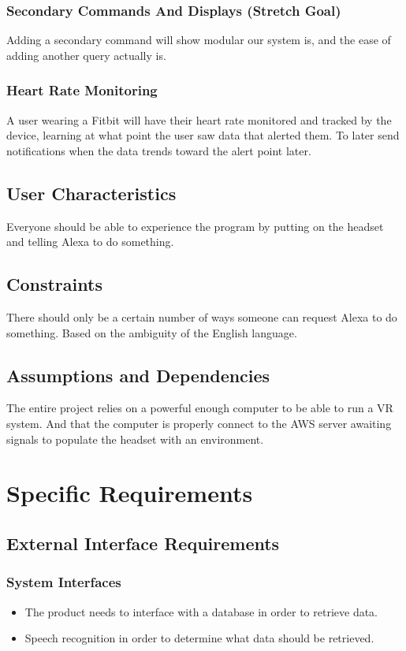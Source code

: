 \documentclass[onecolumn, draftclsnofoot,10pt, compsoc]{IEEEtran}
\begin{document}
        \subsubsection{Secondary Commands And Displays (Stretch Goal)}
            Adding a secondary command will show modular our system is, and the ease of adding another query actually is.

        \subsubsection{Heart Rate Monitoring}
            A user wearing a Fitbit will have their heart rate monitored and tracked by the device, learning at what point the user saw data that alerted them. To later send notifications when the data trends toward the alert point later.

    \subsection{User Characteristics}
        Everyone should be able to experience the program by putting on the headset and telling Alexa to do something.

    \subsection{Constraints}
        There should only be a certain number of ways someone can request Alexa to do something. Based on the ambiguity of the English language.

    \subsection{Assumptions and Dependencies}
        The entire project relies on a powerful enough computer to be able to run a VR system. And that the computer is properly connect to the AWS server awaiting signals to populate the headset with an environment.

\section{Specific Requirements}
    \subsection{External Interface Requirements}
        \subsubsection{System Interfaces}
            \begin{itemize}
                \item The product needs to interface with a database in order to retrieve data.
                \item Speech recognition in order to determine what data should be retrieved.
            \end{itemize}
\end{document}
